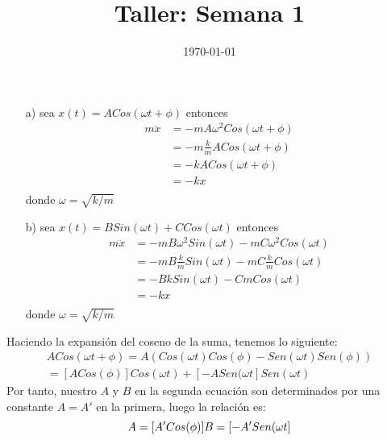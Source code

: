 \documentclass[a4paper]{article}
\date{\today}
\title{Taller: Semana 1}
\begin{document}
    \header{}

    \begin{answer}[Problema 1.]
    \begin{enumerate}
        \item [a)] sea $x(t) = ACos(\omega t + \phi)$ entonces
        \begin{equation*}
        \begin{split}
             m \ddot{x} &= -mA\omega^2 Cos(\omega t + \phi)\\
            &=  -m\frac{k}{m}A Cos(\omega t + \phi)\\
            &=  -k A Cos(\omega t + \phi)\\
             &=  -kx\\
        \end{split}
        \end{equation*}
            donde $\omega = \sqrt{k/m}$
              \item [b)] sea $x(t) = BSin(\omega t) + CCos(\omega t)$ entonces
        \begin{equation*}
        \begin{split}
             m \ddot{x} &= -mB\omega^2Sin(\omega t) - mC\omega^2Cos(\omega t)\\
            &= -mB\frac{k}{m}Sin(\omega t) - mC\frac{k}{m}Cos(\omega t)\\
            &= -BkSin(\omega t) - CmCos(\omega t)\\
             &=  -kx\\
        \end{split}
        \end{equation*}
            donde $\omega = \sqrt{k/m}$
            
            
    \end{enumerate}
    \end{answer}
    
    \begin{answer}[Problema 2.]
        Haciendo la expansión del coseno de la suma, tenemos lo siguiente:
        \begin{equation}
            \begin{split}
                A Cos(\omega t + \phi) = A(Cos(\omega t)Cos(\phi) - Sen(\omega t)Sen(\phi))\\
                = [ACos(\phi)]Cos(\omega t) + [-ASen(\omega t]Sen(\omega t)
            \end{split}
        \end{equation}
        Por tanto, nuestro $A$ y $B$ en la segunda ecuación son determinados por una constante $A=A'$ en la primera, luego la relación es:
        \begin{equation}
            A = [A'Cos(\phi)]\\
            B = [-A'Sen(\omega t]
        \end{equation}
    
    \end{answer}
    
\end{document}
